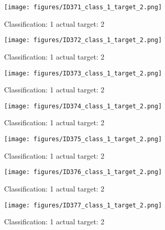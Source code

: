 \begin{figure}[h!]
\begin{center}
\texttt{[image: figures/ID371\_class\_1\_target\_2.png]}
\end{center}
\caption{ Classification: 1 actual target: 2}
\label{fig:ID371_class_1_target_2}
\end{figure}
\begin{figure}[h!]
\begin{center}
\texttt{[image: figures/ID372\_class\_1\_target\_2.png]}
\end{center}
\caption{ Classification: 1 actual target: 2}
\label{fig:ID372_class_1_target_2}
\end{figure}
\begin{figure}[h!]
\begin{center}
\texttt{[image: figures/ID373\_class\_1\_target\_2.png]}
\end{center}
\caption{ Classification: 1 actual target: 2}
\label{fig:ID373_class_1_target_2}
\end{figure}
\begin{figure}[h!]
\begin{center}
\texttt{[image: figures/ID374\_class\_1\_target\_2.png]}
\end{center}
\caption{ Classification: 1 actual target: 2}
\label{fig:ID374_class_1_target_2}
\end{figure}
\begin{figure}[h!]
\begin{center}
\texttt{[image: figures/ID375\_class\_1\_target\_2.png]}
\end{center}
\caption{ Classification: 1 actual target: 2}
\label{fig:ID375_class_1_target_2}
\end{figure}
\begin{figure}[h!]
\begin{center}
\texttt{[image: figures/ID376\_class\_1\_target\_2.png]}
\end{center}
\caption{ Classification: 1 actual target: 2}
\label{fig:ID376_class_1_target_2}
\end{figure}
\begin{figure}[h!]
\begin{center}
\texttt{[image: figures/ID377\_class\_1\_target\_2.png]}
\end{center}
\caption{ Classification: 1 actual target: 2}
\label{fig:ID377_class_1_target_2}
\end{figure}

